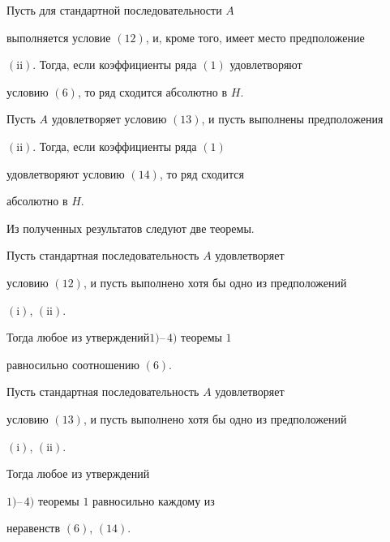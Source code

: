 \begin{prop}


Пусть для стандартной последовательности $A$


выполняется условие $(12)$, и, кроме того, имеет место предположение


$(\mathrm{ii})$. Тогда, если коэффициенты ряда $(1)$ удовлетворяют


условию $(6)$, то ряд сходится абсолютно в $H$.


\end{prop}





\begin{prop}


Пусть $A$ удовлетворяет условию $(13)$, и пусть выполнены предположения


$(\mathrm{ii})$. Тогда, если коэффициенты ряда $(1)$


удовлетворяют условию $(14)$, то ряд сходится


абсолютно в $H$.


\end{prop}





Из полученных результатов следуют две теоремы.





\begin{thm}


Пусть стандартная последовательность $A$ удовлетворяет


условию $(12)$, и пусть выполнено хотя бы одно из предположений


$(\mathrm i)$, $(\mathrm{ii})$.


Тогда любое из утверждений\linebreak $1)$--\,$4)$ теоремы $1$


равносильно соотношению $(6)$.


\end{thm}





\begin{thm}


Пусть стандартная последовательность $A$ удовлетворяет


условию $(13)$, и пусть выполнено хотя бы одно из предположений


$(\mathrm i)$, $(\mathrm{ii})$.


Тогда любое из утверждений\linebreak


$1)$--\,$4)$ теоремы $1$ равносильно каждому из


неравенств $(6)$, $(14)$.


\end{thm}





